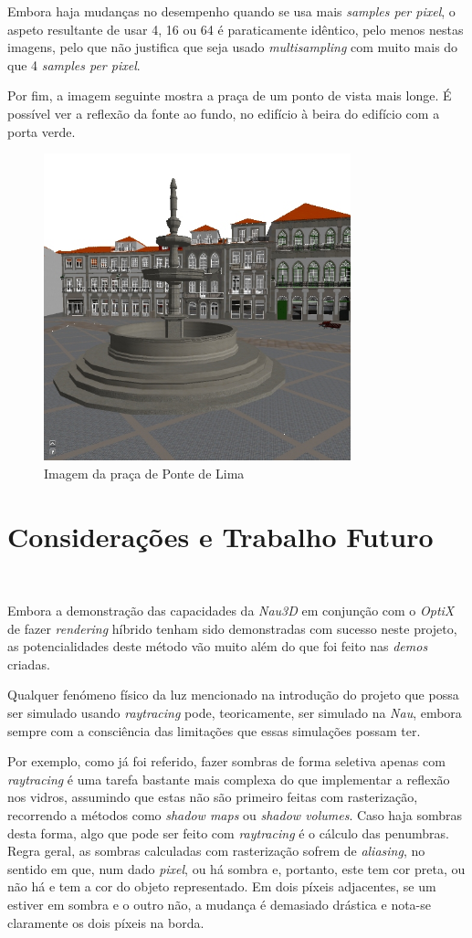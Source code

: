 \documentclass[10pt]{article}
\begin{document}
Embora haja mudanças no desempenho quando se usa mais \textit{samples per pixel}, o aspeto resultante de usar 4, 16 ou 64 é paraticamente idêntico, pelo menos nestas imagens, pelo que não justifica que seja usado \textit{multisampling} com muito mais do que 4 \textit{samples per pixel}.

Por fim, a imagem seguinte mostra a praça de um ponto de vista mais longe. É possível ver a reflexão da fonte ao fundo, no edifício à beira do edifício com a porta verde.

\begin{figure}[H]
    \centering
    \includegraphics[width=3.5in]{scene_and_reflection.jpg}
    \caption{Imagem da praça de Ponte de Lima}
\end{figure}



\section{Considerações e Trabalho Futuro}~ \label{sec:cetf}

Embora a demonstração das capacidades da \textit{Nau3D} em conjunção com o \textit{OptiX} de fazer \textit{rendering} híbrido tenham sido demonstradas com sucesso neste projeto, as potencialidades deste método vão muito além do que foi feito nas \textit{demos} criadas.

Qualquer fenómeno físico da luz mencionado na introdução do projeto que possa ser simulado usando \textit{raytracing} pode, teoricamente, ser simulado na \textit{Nau}, embora sempre com a consciência das limitações que essas simulações possam ter.

Por exemplo, como já foi referido, fazer sombras de forma seletiva apenas com \textit{raytracing} é uma tarefa bastante mais complexa do que implementar a reflexão nos vidros, assumindo que estas não são primeiro feitas com rasterização, recorrendo a métodos como \textit{shadow maps} ou \textit{shadow volumes}. Caso haja sombras desta forma, algo que pode ser feito com \textit{raytracing} é o cálculo das penumbras. Regra geral, as sombras calculadas com rasterização sofrem de \textit{aliasing}, no sentido em que, num dado \textit{pixel}, ou há sombra e, portanto, este tem cor preta, ou não há e tem a cor do objeto representado. Em dois píxeis adjacentes, se um estiver em sombra e o outro não, a mudança é demasiado drástica e nota-se claramente os dois píxeis na borda.
\end{document}
